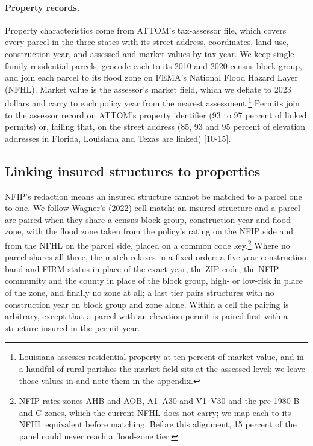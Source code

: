 \paragraph{Property records.}
Property characteristics come from ATTOM's tax-assessor file, which covers every parcel in the
three states with its street address, coordinates, land use, construction year, and assessed
and market values by tax year. We keep single-family residential parcels, geocode each to its
2010 and 2020 census block group, and join each parcel to its flood zone on FEMA's National
Flood Hazard Layer (NFHL). Market value is the assessor's market field, which we deflate to 2023
dollars and carry to each policy year from the nearest assessment.\footnote{Louisiana assesses
residential property at ten percent of market value, and in a handful of rural parishes the
market field sits at the assessed level; we leave those values in and note them in the
appendix.} Permits join to the assessor record on ATTOM's property identifier (93 to 97 percent
of linked permits) or, failing that, on the street address (85, 93 and 95 percent of elevation
addresses in Florida, Louisiana and Texas are linked) [10-15].

\subsection{Linking insured structures to properties}

NFIP's redaction means an insured structure cannot be matched to a parcel one to one. We
follow Wagner's (2022) cell match: an insured structure and a parcel are paired when they share
a census block group, construction year and flood zone, with the flood zone taken from the
policy's rating on the NFIP side and from the NFHL on the parcel side, placed on a common code
key.\footnote{NFIP rates zones AHB and AOB, A1--A30 and V1--V30 and the pre-1980 B and C
zones, which the current NFHL does not carry; we map each to its NFHL equivalent before
matching. Before this alignment, 15 percent of the panel could never reach a flood-zone
tier.} Where no parcel shares all three, the match relaxes in a fixed order: a five-year
construction band and FIRM status in place of the exact year, the ZIP code, the NFIP
community and the county in place of the block group, high- or low-risk in place of the zone,
and finally no zone at all; a last tier pairs structures with no construction year on block
group and zone alone. Within a cell the pairing is arbitrary, except that a parcel with an
elevation permit is paired first with a structure insured in the permit year.

